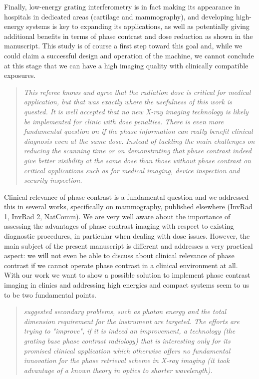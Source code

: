 \documentclass[a4paper,english]{scrartcl}
\newenvironment{reviewerquote}{\begin{quote}\itshape}{\end{quote}}
\begin{document}
Finally, low-energy grating interferometry is in fact making its appearance
in hospitals in dedicated areas (cartilage and mammography), and developing
high-energy systems is key to expanding its applications, as well as
potentially giving
additional benefits in terms of phase contrast and dose reduction as shown
in the manuscript.
This study is of course a first step toward this goal and,
while we could claim a successful design and operation of the machine, we
cannot conclude at this stage that we can have a high imaging quality with
clinically compatible exposures.


\begin{reviewerquote}
This referee knows and agree that the radiation dose is critical
for medical application, but that was exactly where the usefulness of this
work is quested. It is well accepted that no new X-ray imaging technology is
likely be implemented for clinic with dose penalties. There is even more
fundamental question on if the phase information can really benefit clinical
diagnosis even at the same dose. Instead of tackling the main challenges on
reducing the scanning time or on demonstrating that phase contrast indeed
give better visibility at the same dose than those without phase contrast on
critical applications such as for medical imaging, device inspection and
security inspection.
\end{reviewerquote}

Clinical relevance of phase contrast is a fundamental question
and we addressed this in several works, specifically on mammography,
published elsewhere (InvRad 1, InvRad 2, NatComm). We are very well aware
about the importance of assessing the advantages of phase contrast imaging
with respect to existing diagnostic procedures, in particular when dealing
with dose issues. However, the main subject of the present manuscript is
different and addresses a very practical aspect: we will not even be able to
discuss about clinical relevance of phase contrast if we cannot operate
phase contrast in a clinical environment at all. With our work we want to
show a possible solution to implement phase contrast imaging in clinics and
addressing high energies and compact systems seem to us to be two
fundamental points. 

\begin{reviewerquote}
suggested secondary problems, such as photon energy and the
total dimension requirement for the instrument are targeted. The efforts are
trying to "improve", if it is indeed an improvement, a technology (the
grating base phase contrast radiology) that is interesting only for its
promised clinical application which otherwise offers no fundamental
innovation for the phase retrieval scheme in X-ray imaging (it took
advantage of a known theory in optics to shorter wavelength).
\end{reviewerquote}
\end{document}
